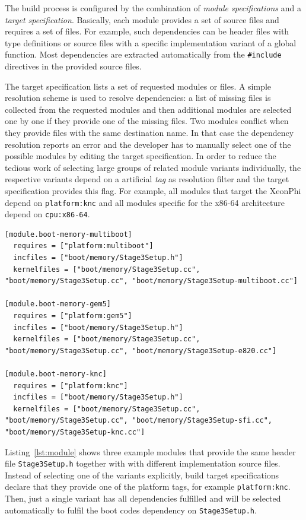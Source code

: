 The build process is configured by the combination of \emph{module specifications} and a \emph{target specification}. Basically, each module provides a set of source files and requires a set of files. For example, such dependencies can be header files with type definitions or source files with a specific implementation variant of a global function. Most dependencies are extracted automatically from the \texttt{\#include} directives in the provided source files. 

The target specification lists a set of requested modules or files. A simple resolution scheme is used to resolve dependencies: a list of missing files is collected from the requested modules and then additional modules are selected one by one if they provide one of the missing files. Two modules conflict when they provide files with the same destination name. In that case the dependency resolution reports an error and the developer has to manually select one of the possible modules by editing the target specification. In order to reduce the tedious work of selecting large groups of related module variants individually, the respective variants depend on a artificial \emph{tag} as resolution filter and the target specification provides this flag. For example, all modules that target the XeonPhi depend on \texttt{platform:knc} and all modules specific for the x86-64 architecture depend on \texttt{cpu:x86-64}.

\begin{lstlisting}[float, label=lst:module, caption=An example module specification.]
[module.boot-memory-multiboot]
  requires = ["platform:multiboot"]
  incfiles = ["boot/memory/Stage3Setup.h"]
  kernelfiles = ["boot/memory/Stage3Setup.cc", "boot/memory/Stage3Setup.cc", "boot/memory/Stage3Setup-multiboot.cc"]

[module.boot-memory-gem5]
  requires = ["platform:gem5"]
  incfiles = ["boot/memory/Stage3Setup.h"]
  kernelfiles = ["boot/memory/Stage3Setup.cc", "boot/memory/Stage3Setup.cc", "boot/memory/Stage3Setup-e820.cc"]

[module.boot-memory-knc]
  requires = ["platform:knc"]
  incfiles = ["boot/memory/Stage3Setup.h"]
  kernelfiles = ["boot/memory/Stage3Setup.cc", "boot/memory/Stage3Setup.cc", "boot/memory/Stage3Setup-sfi.cc", "boot/memory/Stage3Setup-knc.cc"]
\end{lstlisting}

Listing~\ref{lst:module} shows three example modules that provide the same header file \texttt{Stage3Setup.h} together with with different implementation source files. Instead of selecting one of the variants explicitly, build target specifications declare that they provide one of the platform tags, for example \texttt{platform:knc}. Then, just a single variant has all dependencies fulfilled and will be selected automatically to fulfil the boot codes dependency on \texttt{Stage3Setup.h}.

